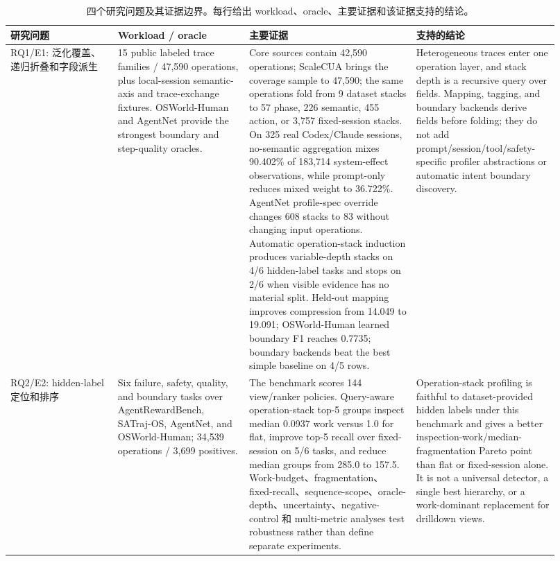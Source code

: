\documentclass[10pt,twocolumn]{ctexart}
\begin{document}
\begin{table}[t]
  \centering
  \tiny
  \setlength{\tabcolsep}{2.2pt}
  \renewcommand{\arraystretch}{0.92}
  \caption{四个研究问题及其证据边界。每行给出 workload、oracle、主要证据和该证据支持的结论。}
  \label{tab:results}
  \begin{tabular}{p{0.18\linewidth}p{0.22\linewidth}p{0.28\linewidth}p{0.24\linewidth}}
    \toprule
    研究问题 & Workload / oracle & 主要证据 & 支持的结论 \\
    \midrule
    RQ1/E1: 泛化覆盖、递归折叠和字段派生 & 15 public labeled trace families / 47,590 operations, plus local-session semantic-axis and trace-exchange fixtures. OSWorld-Human and AgentNet provide the strongest boundary and step-quality oracles. & Core sources contain 42,590 operations; ScaleCUA brings the coverage sample to 47,590; the same operations fold from 9 dataset stacks to 57 phase, 226 semantic, 455 action, or 3,757 fixed-session stacks. On 325 real Codex/Claude sessions, no-semantic aggregation mixes 90.402\% of 183,714 system-effect observations, while prompt-only reduces mixed weight to 36.722\%. AgentNet profile-spec override changes 608 stacks to 83 without changing input operations. Automatic operation-stack induction produces variable-depth stacks on 4/6 hidden-label tasks and stops on 2/6 when visible evidence has no material split. Held-out mapping improves compression from 14.049 to 19.091; OSWorld-Human learned boundary F1 reaches 0.7735; boundary backends beat the best simple baseline on 4/5 rows. & Heterogeneous traces enter one operation layer, and stack depth is a recursive query over fields. Mapping, tagging, and boundary backends derive fields before folding; they do not add prompt/session/tool/safety-specific profiler abstractions or automatic intent boundary discovery. \\
    RQ2/E2: hidden-label 定位和排序 & Six failure, safety, quality, and boundary tasks over AgentRewardBench, SATraj-OS, AgentNet, and OSWorld-Human; 34,539 operations / 3,699 positives. & The benchmark scores 144 view/ranker policies. Query-aware operation-stack top-5 groups inspect median 0.0937 work versus 1.0 for flat, improve top-5 recall over fixed-session on 5/6 tasks, and reduce median groups from 285.0 to 157.5. Work-budget、fragmentation、fixed-recall、sequence-scope、oracle-depth、uncertainty、negative-control 和 multi-metric analyses test robustness rather than define separate experiments. & Operation-stack profiling is faithful to dataset-provided hidden labels under this benchmark and gives a better inspection-work/median-fragmentation Pareto point than flat or fixed-session alone. It is not a universal detector, a single best hierarchy, or a work-dominant replacement for drilldown views. \\

\end{tabular}
\end{table}
\end{document}
